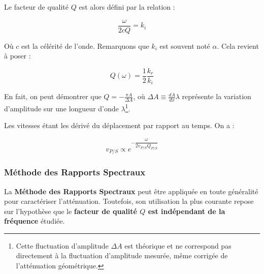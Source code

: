 Le facteur de qualité $Q$ est alors défini par la relation :

\begin{equation}
\frac{\omega}{2cQ} = k_i
\end{equation}

Où $c$ est la célérité de l'onde. Remarquons que $k_i$ est souvent noté $\alpha$.
Cela revient à poser :

\begin{equation}
\boxed{
Q(\omega) = \frac{1}{2}\frac{k_r}{k_i}
}
\end{equation}

En fait, on peut démontrer que $Q = -\frac{\pi A}{\Delta A}$, où $\Delta A \equiv \frac{dA}{dx} \lambda$ représente la variation d'amplitude sur une longueur d'onde $\lambda$\footnote{Cette fluctuation d'amplitude $\Delta A$ est théorique et ne correspond pas directement à la fluctuation d'amplitude mesurée, même corrigée de l'atténuation géométrique.}.\par 

Les vitesses étant les dérivé du déplacement par rapport au temps. On a :

\begin{equation}
    v_{P/S} \propto  e^{-\dfrac{\omega}{2v_{P/S}Q_{P/S}}}
\end{equation}


\subsubsection*{Méthode des Rapports Spectraux}



La \textbf{Méthode des Rapports Spectraux} peut être appliquée en toute généralité pour caractériser l'atténuation. Toutefois, son utilisation la plus courante repose sur l'hypothèse que le \textbf{facteur de qualité $Q$ est indépendant de la fréquence} étudiée.

